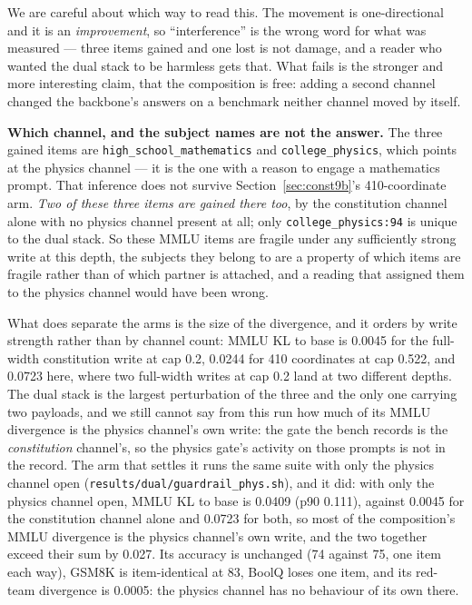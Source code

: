 \documentclass[11pt]{article}
\newcommand{\code}[1]{\texttt{#1}}
\begin{document}
We are careful about which way to read this. The movement is one-directional and it
is an \emph{improvement}, so ``interference'' is the wrong word for what was
measured --- three items gained and one lost is not damage, and a reader who wanted
the dual stack to be harmless gets that. What fails is the stronger and more
interesting claim, that the composition is free: adding a second channel changed the
backbone's answers on a benchmark neither channel moved by itself.

\textbf{Which channel, and the subject names are not the answer.} The three gained
items are \code{high\_school\_mathematics} and \code{college\_physics},
which points at the physics channel --- it is the one with a reason to engage a
mathematics prompt. That inference does not survive Section~\ref{sec:const9b}'s
410-coordinate arm. \emph{Two of these three items are gained there too}, by the
constitution channel alone with no physics channel present at all; only
\code{college\_physics:94} is unique to the dual stack. So these MMLU items are fragile under any
sufficiently strong write at this depth, the subjects they belong to are a property
of which items are fragile rather than of which partner is attached, and a reading
that assigned them to the physics channel would have been wrong.

What does separate the arms is the size of the divergence, and it orders by write
strength rather than by channel count: MMLU KL to base is 0.0045 for the full-width
constitution write at cap 0.2, 0.0244 for 410 coordinates at cap 0.522, and 0.0723
here, where two full-width writes at cap 0.2 land at two different depths. The dual
stack is the largest perturbation of the three and the only one carrying two
payloads, and we still cannot say from this run how much of its MMLU divergence is
the physics channel's own write: the gate the bench records is the
\emph{constitution} channel's, so the physics gate's activity on those prompts is
not in the record. The arm that settles it runs the same suite with only the physics
channel open (\code{results/dual/guardrail\_phys.sh}), and it did: with only the
physics channel open, MMLU KL to base is 0.0409 (p90 0.111), against 0.0045 for
the constitution channel alone and 0.0723 for both, so most of the composition's
MMLU divergence is the physics channel's own write, and the two together exceed
their sum by 0.027. Its accuracy is unchanged (74 against 75, one item each way),
GSM8K is item-identical at 83, BoolQ loses one item, and its red-team divergence
is 0.0005: the physics channel has no behaviour of its own there.
\end{document}
